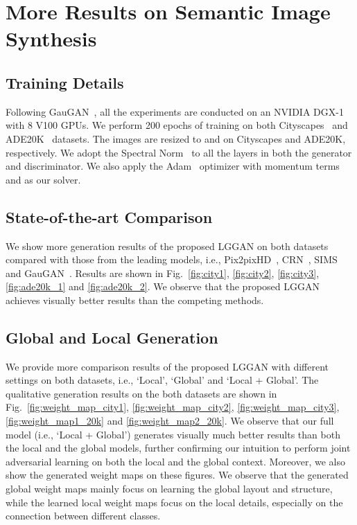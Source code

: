 \documentclass[10pt,twocolumn,letterpaper]{article}
\begin{document}
\section{More Results on Semantic Image Synthesis}



\subsection{Training Details}
\label{sec:2}
Following GauGAN~\cite{park2019semantic}, all the experiments are conducted on an NVIDIA DGX-1 with 8 V100 GPUs.
We perform 200 epochs of training on both  Cityscapes~\cite{cordts2016cityscapes} and ADE20K~\cite{zhou2017scene} datasets.
The images are resized to  and  on Cityscapes and ADE20K, respectively.
We adopt the Spectral Norm~\cite{miyato2018spectral} to all the layers in both the generator and discriminator.
We also apply the Adam~\cite{kingma2014adam} optimizer with momentum terms   and  as our solver.

\subsection{State-of-the-art Comparison}
\label{sec:4}
We show more generation results of the proposed LGGAN on both datasets compared with those from the leading models, i.e., Pix2pixHD~\cite{wang2018high}, CRN~\cite{chen2017photographic}, SIMS~\cite{qi2018semi} and GauGAN~\cite{park2019semantic}.
Results are shown in Fig.~\ref{fig:city1}, \ref{fig:city2}, \ref{fig:city3}, \ref{fig:ade20k_1} and \ref{fig:ade20k_2}.
We observe that the proposed LGGAN achieves visually better results than the competing methods. 








\subsection{Global and Local Generation}
\label{sec:3}
We provide more comparison results of the proposed LGGAN with different settings on both datasets, i.e., `Local', `Global' and `Local + Global'. 
The qualitative generation results on the both datasets are shown in Fig.~\ref{fig:weight_map_city1}, \ref{fig:weight_map_city2}, \ref{fig:weight_map_city3}, \ref{fig:weight_map1_20k} and \ref{fig:weight_map2_20k}.
We observe that our full model (i.e., `Local + Global') generates visually much better results than both the local and the global models, further confirming our intuition to perform  joint adversarial learning on both the local and the global context.
Moreover, we also show the generated weight maps on these figures.
We observe that the generated global weight maps mainly focus on learning the global layout and structure, while the learned local weight maps focus on the local details, especially on the connection between different classes. 
\end{document}
